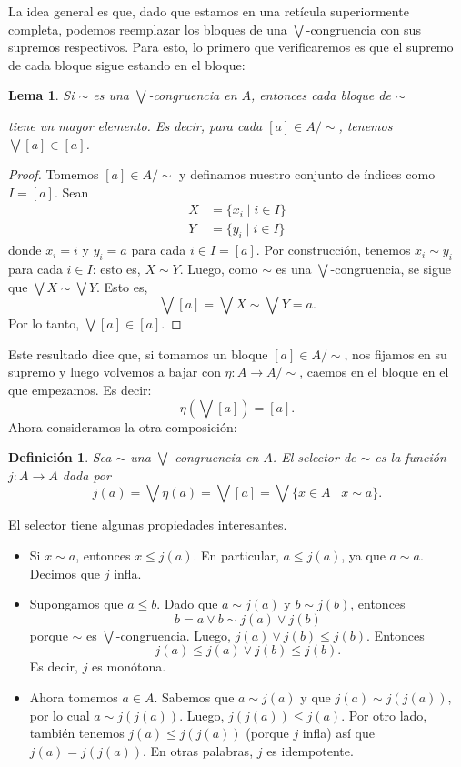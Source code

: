 \documentclass[12pt,letterpaper,titlepage]{article}
\newtheorem*{defn}{Definición}
\newtheorem{lemma}{Lema}
\theoremstyle{definition}
\renewcommand\sup{\vee}
\newcommand\Sup{\bigvee}
\newcommand\simr{{\sim}}
\newcommand\<{\langle}
\renewcommand\>{\rangle}
\begin{document}
La idea general es que, dado que estamos en una retícula superiormente completa,
podemos reemplazar los bloques de una $\Sup$-congruencia con sus supremos 
respectivos.
Para esto, lo primero que verificaremos es que el supremo de cada bloque sigue
estando en el bloque:
\begin{lemma}
    Si $\sim$ es una $\Sup$-congruencia en $A$, entonces cada bloque de $\simr$

   tiene un mayor elemento.
    Es decir, para cada $[a]\in A/\simr$, tenemos $\Sup[a]\in [a]$.
\end{lemma}
\begin{proof}
    Tomemos $[a]\in A/\simr$ y definamos nuestro conjunto de índices como $I=[a]$.
    Sean
    \begin{align*}
        X &= \{x_i \mid i\in I\} \\
        Y &= \{y_i \mid i\in I\}
    \end{align*}
    donde $x_i=i$ y $y_i=a$ para cada $i\in I=[a]$.
    Por construcción, tenemos $x_i\sim y_i$ para cada $i\in I$: esto es, $X\sim Y$.
    Luego, como $\sim$ es una $\Sup$-congruencia, se sigue que $\Sup X\sim\Sup Y$.
    Esto es,
    \[
        \Sup[a] = \Sup X \sim \Sup Y = a
    .\]
    Por lo tanto, $\Sup [a]\in [a]$.
\end{proof}
Este resultado dice que, si tomamos un bloque $[a]\in A/\simr$, nos fijamos en su
supremo y luego volvemos a bajar con $\eta:A\to A/\simr$, caemos en
el bloque en el que empezamos.
Es decir:
\[
    \eta(\Sup [a]) = [a]
.\]
Ahora consideramos la otra composición:
\begin{defn}
    Sea $\simr$ una $\Sup$-congruencia en $A$.
    El \emph{selector} de $\simr$ es la función $j:A\to A$ dada por
    \[
        j(a) = \Sup\eta(a) = \Sup[a] = \Sup\{x\in A \mid x\sim a\}
    .\]
\end{defn}
El selector tiene algunas propiedades interesantes.
\begin{itemize}
    \item 
    Si $x\sim a$, entonces $x\leq j(a)$.
    En particular, $a\leq j(a)$, ya que $a\sim a$.
    Decimos que $j$ infla.
    \item
    Supongamos que $a\leq b$.
    Dado que $a\sim j(a)$ y $b\sim j(b)$, entonces
    \[
        b = a\sup b \sim j(a) \sup j(b)
    \]
    porque $\simr$ es $\Sup$-congruencia.
    Luego, $j(a) \sup j(b) \leq j(b)$.
    Entonces
    \[
        j(a)\leq j(a)\sup j(b) \leq j(b)
    .\]
    Es decir, $j$ es monótona.
    \item
    Ahora tomemos $a\in A$.
    Sabemos que $a\sim j(a)$ y que $j(a)\sim j(j(a))$,
    por lo cual $a\sim j(j(a))$.
    Luego, $j(j(a))\leq j(a)$.
    Por otro lado, también tenemos $j(a)\leq j(j(a))$ (porque $j$ infla) así que
    $j(a)=j(j(a))$.
    En otras palabras, $j$ es idempotente.
\end{itemize}
\end{document}
